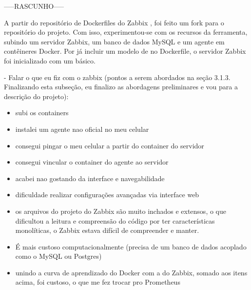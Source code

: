 {\color{blue}
-----RASCUNHO-----

A partir do repositório de Dockerfiles do Zabbix \citep{zabbixdocker2025}, foi feito um fork para o repositório do projeto. Com isso, experimentou-se com os recursos da ferramenta, subindo um servidor Zabbix, um banco de dados MySQL e um agente em contêineres Docker. Por já incluir um modelo de  no Dockerfile, o servidor Zabbix foi inicializado com um  básico.


- Falar o que eu fiz com o zabbix (pontos a serem abordados na seção 3.1.3. Finalizando esta subseção, eu finalizo as abordagens preliminares e vou para a descrição do projeto):
    \begin{itemize}
        \item subi os containers
        \item instalei um agente nao oficial no meu celular
        \item consegui pingar o meu celular a partir do container do servidor
        \item consegui vincular o container do agente ao servidor
        \item acabei nao gostando da interface e navegabilidade
        \item dificuldade realizar configurações avançadas via interface web
        \item os arquivos do projeto do Zabbix são muito inchados e extensos, o que dificultou a leitura e compreensão do código por ter características monolíticas, o Zabbix estava difícil de compreender e manter.
        \item É mais custoso computacionalmente (precisa de um banco de dados acoplado como o MySQL ou Postgres)
        \item unindo a curva de aprendizado do Docker com a do Zabbix, somado aos itens acima, foi custoso, o que me fez trocar pro Prometheus 
    
    \end{itemize}
     

    



}
